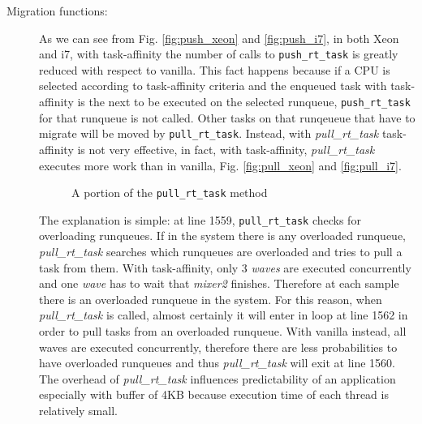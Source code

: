 \begin{description}
\item[Migration functions:] As we can see from Fig. \ref{fig:push_xeon} and \ref{fig:push_i7}, in both Xeon and i7, with task-affinity the number of calls 
to \texttt{push\_rt\_task} is greatly reduced with respect to vanilla. This fact happens because if a CPU is selected according to task-affinity criteria 
and the enqueued task with task-affinity is the next to be executed on the selected runqueue, \texttt{push\_rt\_task} for that runqueue is not called. 
Other tasks on that runqeueue that have to migrate will be moved by \texttt{pull\_rt\_task}. Instead, with \textit{pull\_rt\_task} task-affinity is not 
very effective, in fact, with task-affinity, \textit{pull\_rt\_task} executes more work than in vanilla, Fig. \ref{fig:pull_xeon} and \ref{fig:pull_i7}.

\begin{figure}[h]
  \lstset{basicstyle=\footnotesize, language=c, captionpos=b, frame=single,label=lis:steps}
  
  \caption{A portion of the \texttt{pull\_rt\_task} method}
  \label{code:pull_task_code}
\end{figure}

The explanation is simple: at line 1559, \texttt{pull\_rt\_task} checks for overloading runqueues. If in the system there 
is any overloaded runqueue, \textit{pull\_rt\_task} searches which runqueues are overloaded and tries to pull a task from them. With task-affinity, only 3 
\textit{waves} are executed concurrently and one \textit{wave} has to wait that \textit{mixer2} finishes. Therefore at each sample there is an overloaded 
runqueue in the system. For this reason, when \textit{pull\_rt\_task} is called, almost certainly it will enter in loop at line 1562 in order to pull tasks 
from an overloaded runqueue. With vanilla instead, all waves are executed concurrently, therefore there are less probabilities to have overloaded runqueues 
and thus \textit{pull\_rt\_task} will exit at line 1560. The overhead of \textit{pull\_rt\_task} influences predictability of an application especially with 
buffer of 4KB because execution time of each thread is relatively small.

\end{description}

